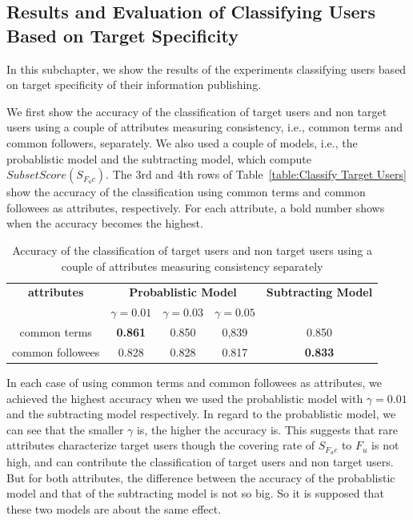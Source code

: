 \subsection{Results and Evaluation of Classifying Users Based on Target
  Specificity}
\label{subsec:Results of Method1}

In this subchapter, we show the results of the experiments classifying
users based on target specificity of their information publishing.

We first show the accuracy of the classification of target users and
non target users using a couple of attributes measuring consistency,
i.e., common terms and common followers, separately.  We also used a
couple of models, i.e., the
probablistic model and the subtracting model, which compute
$\mathit{SubsetScore}(S_{F_uc})$.
The 3rd and 4th rows of Table~\ref{table:Classify
Target Users} show the accuracy of the classification using common
terms and common followees as attributes, respectively.  For each
attribute, a bold number shows when the accuracy becomes the highest.

\begin{table}[t]
\caption{Accuracy of the classification of target users and non target
 users using a couple of attributes measuring consistency separately
 \label{table:Classify Target Users}}
\begin{center}
\begin{tabular}{ccccc}
 \toprule
 {\bf attributes} & \multicolumn{3}{c}{{\bf Probablistic Model}} & {\bf
 Subtracting Model} \\
 & $\gamma = 0.01$ & $\gamma = 0.03$ & $\gamma = 0.05$ & \\
 \cmidrule(lr){1-1}\cmidrule(lr){2-4}\cmidrule(lr){5-5}
 common terms & {\bf 0.861} & 0.850 & 0,839 & 0.850 \\
 common followees & 0.828 & 0.828 & 0.817 & {\bf 0.833} \\
 \bottomrule
\end{tabular}
\end{center}
\end{table}

In each case of using common terms and common followees as attributes,
we achieved the highest accuracy when we used the probablistic model
with $\gamma = 0.01$ and the subtracting model respectively.  In regard
to the probablistic model, we can see that the smaller $\gamma$ is,
the higher the accuracy is.  This suggests that rare attributes
characterize target users though the covering rate of $S_{F_uc}$ to
$F_u$ is not high, and can contribute the classification of target users
and non target users.  But for both attributes, the difference between
the accuracy of the probablistic model and that of the subtracting
model is not so big.  So it is supposed that these two models are
about the same effect.

